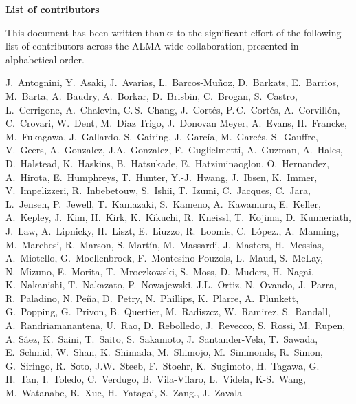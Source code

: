\vspace*{-0.4cm}
\begin{center}
\textbf{\Large List of contributors}\\
\end{center}


This document has been written thanks to the significant effort of the following list of contributors across the ALMA-wide collaboration, presented in alphabetical order. 

J.~Antognini, Y.~Asaki, J.~Avarias, 
L.~Barcos-Mu\~noz, D.~Barkats, E.~Barrios, M.~Barta, A.~Baudry, A.~Borkar, D.~Brisbin, C.~Brogan, 
S.~Castro, L.~Cerrigone, A.~Chalevin, C.\,S.~Chang, J.~Cort\'es, P.\,C.~Cort\'es, A.~Corvillón, C.~Crovari,
W.~Dent, M.~D\'iaz Trigo, J.~Donovan Meyer,
A.~Evans,
H.~Francke, M.~Fukagawa, 
J.~Gallardo, S.~Gairing, J.~García, M.~Garcés, S.~Gauffre, V.~Geers, A.~Gonzalez, J.A.~Gonzalez, F.~Guglielmetti, A.~Guzman,
A.~Hales, D.~Halstead, K.~Haskins, B.~Hatsukade, E.~Hatziminaoglou, O.~Hernandez, A.~Hirota, E.~Humphreys, T.~Hunter, Y.-J.~Hwang,
J.~Ibsen, K.~Immer,
V.~Impelizzeri, R.~Inbebetouw, S.~Ishii, T.~Izumi,
C.~Jacques, C.~Jara, L.~Jensen, P.~Jewell,
T.~Kamazaki, S.~Kameno, A.~Kawamura, E.~Keller, A.~Kepley, J.~Kim, H.~Kirk, K.~Kikuchi, R.~Kneissl, T.~Kojima, D.~Kunneriath, 
J.~Law, A.~Lipnicky, H.~Liszt, E.~Liuzzo, R.~Loomis, C.~López.,
A.~Manning, M.~Marchesi, R.~Marson, S. Mart\'in, %
M.~Massardi, J.~Masters, H.~Messias, 
A.~Miotello, G.~Moellenbrock, F.~Montesino Pouzols, L.~Maud, S.~McLay, N.~Mizuno, E.~Morita, T.~Mroczkowski, S.~Moss, D.~Muders, 
H.~Nagai, K.~Nakanishi, T.~Nakazato, P.~Nowajewski,
J.L.~Ortiz, N.~Ovando, 
J.~Parra, R.~Paladino, N. Pe\~{n}a, D.~Petry, N.~Phillips, K.~Plarre, A.~Plunkett, G.~Popping, G.~Privon, 
B.~Quertier,
M.~Radiszcz, W.~Ramirez, S.~Randall, A.~Randriamanantena, U.~Rao, D.~Rebolledo, J.~Revecco, S.~Rossi, M.~Rupen,
A. S\'aez, K.~Saini, T.~Saito, S.~Sakamoto, J.~Santander-Vela, T.~Sawada, E.~Schmid, W.~Shan, %
K.~Shimada, M.~Shimojo,  M.~Simmonds, R.~Simon, G.~Siringo, R.~Soto, 
J.W.~Steeb, F.~Stoehr, K.~Sugimoto, 
H.~Tagawa, G.\,H.~Tan, I.~Toledo,
C.~Verdugo, B.~Vila-Vilaro, L.~Videla, 
K-S.~Wang, M.~Watanabe,  
R.~Xue,
H.~Yatagai, 
S.~Zang., J.~Zavala